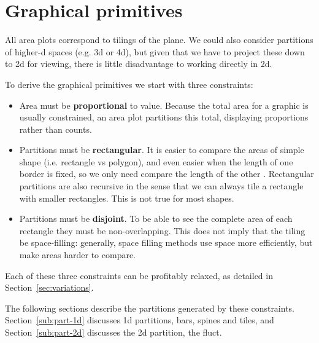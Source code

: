 \documentclass[journal]{vgtc}
\begin{document}
\section{Graphical primitives}
\label{sec:primitives}


All area plots correspond to tilings of the plane. We could also consider partitions of higher-d spaces (e.g. 3d or 4d), but given that we have to project these down to 2d for viewing, there is little disadvantage to working directly in 2d.

To derive the graphical primitives we start with three constraints:

\begin{itemize}
  \item Area must be {\bf proportional} to value. Because the total area for a graphic is usually constrained, an area plot partitions this total, displaying proportions rather than counts.

  \item Partitions must be {\bf rectangular}. It is easier to compare the areas of simple shape (i.e. rectangle vs polygon), and even easier when the length of one border is fixed, so we only need compare the length of the other \citep{cleveland:1984}. Rectangular partitions are also recursive in the sense that we can always tile a rectangle with smaller rectangles. This is not true for most shapes.

  \item Partitions must be {\bf disjoint}. To be able to see the complete area of each rectangle they must be non-overlapping. This does not imply that the tiling be space-filling: generally, space filling methods use space more efficiently, but make areas harder to compare.

\end{itemize}

\noindent Each of these three constraints can be profitably relaxed, as detailed in Section~\ref{sec:variations}.

The following sections describe the partitions generated by these constraints. Section~\ref{sub:part-1d} discusses 1d partitions, bars, spines and tiles, and  Section~\ref{sub:part-2d} discusses the 2d partition, the fluct.

\end{document}
